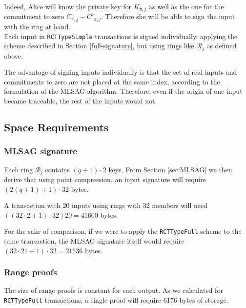 Indeed, Alice will know the private key for \(K_{\pi, j}\) as well as the one for the commitment to zero 
\(C_{\pi, j} - C'_{\pi, j}\). 
Therefore she will be able to sign the input with the ring at hand.
\\

Each input in {\tt RCTTypeSimple} transactions is signed individually, applying the scheme described in Section \ref{full-signature}, but using rings like \(\mathcal{R}_j\) as defined above.

The advantage of signing inputs individually is that the set of real inputs and commitments to zero are not
placed at the same index, according to the formulation of the MLSAG algorithm.
Therefore, even if the origin of one input became traceable, the rest of the inputs would not.


\subsection{Space Requirements}

\subsubsection*{MLSAG signature}

Each ring \(\mathcal{R}_j\) contains \((q+1) \cdot 2\) keys.
From Section \ref{sec:MLSAG} we then derive that using point compression, an input signature
will require \( (2(q+1) + 1) \cdot 32  \) bytes.

A transaction with 20 inputs using rings with 32 members will need \(((32 \cdot 2 + 1) \cdot 32) 20 = 41600 \) bytes.

For the sake of comparison, if we were to apply the {\tt RCTTypeFull} scheme to the same transaction,
the MLSAG signature itself would require \(( 32 \cdot 21 + 1) \cdot 32 = 21536\) bytes.


\subsubsection*{Range proofs}

The size of range proofs is constant for each output.
As we calculated for {\tt RCTTypeFull} transactions, a single proof will require 6176 bytes of storage.


 




